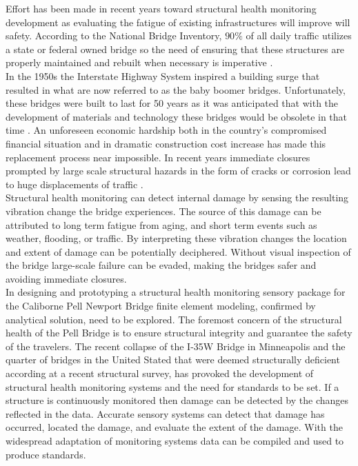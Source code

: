 \indent Effort has been made in recent years toward structural health monitoring development as evaluating the fatigue of existing infrastructures will improve will safety. According to the National Bridge Inventory, $90\%$ of all daily traffic utilizes a state or federal owned bridge so the need of ensuring that these structures are properly maintained and rebuilt when necessary is imperative \cite{RobertS.Kirk:2007}. \\
\indent In the 1950s the Interstate Highway System inspired a building surge that resulted in what are now referred to as the baby boomer bridges. Unfortunately, these bridges were built to last for 50 years as it was anticipated that with the development of materials and technology these bridges would be obsolete in that time \cite{AmericanAssociationofStateHighwayandTransportationOfficials:2008}. An unforeseen economic hardship both in the country’s compromised financial situation and in dramatic construction cost increase has made this replacement process near impossible. In recent years immediate closures prompted by large scale structural hazards in the form of cracks or corrosion lead to huge displacements of traffic \cite{AmericanAssociationofStateHighwayandTransportationOfficials:2008}. \\
\indent Structural health monitoring can detect internal damage by sensing the resulting vibration change the bridge experiences. The source of this damage can be attributed to long term fatigue from aging, and short term events such as weather, flooding, or traffic. By interpreting these vibration changes the location and extent of damage can be potentially deciphered. Without visual inspection of the bridge large-scale failure can be evaded, making the bridges safer and avoiding immediate closures. \\
\indent In designing and prototyping a structural health monitoring sensory package for the Caliborne Pell Newport Bridge finite element modeling, confirmed by analytical solution, need to be explored. The foremost concern of the structural health of the Pell Bridge is to ensure structural integrity and guarantee the safety of the travelers. The recent collapse of the I-35W Bridge in Minneapolis and the quarter of bridges in the United Stated that were deemed structurally deficient according at a recent structural survey, has provoked the development of structural health monitoring systems and the need for standards to be set. If a structure is continuously monitored then damage can be detected by the changes reflected in the data. Accurate sensory systems can detect that damage has occurred, located the damage, and evaluate the extent of the damage. With the widespread adaptation of monitoring systems data can be compiled and used to produce standards. 
